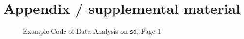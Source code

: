 \documentclass{article}
\begin{document}
	
	
	\appendix
	
	\section{Appendix / supplemental material}
	
	
	\begin{figure}
		\centering
		\caption{Example Code of Data Analysis on \texttt{sd}, Page 1}
		\label{data_analysis_sd_1}
	\end{figure}
\end{document}
